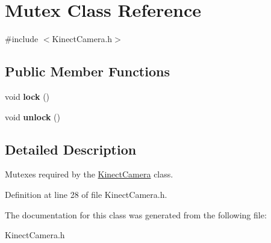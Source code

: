 \hypertarget{class_mutex}{
\section{Mutex Class Reference}
\label{class_mutex}
}


{\ttfamily \#include $<$KinectCamera.h$>$}

\subsection*{Public Member Functions}
\begin{DoxyCompactItemize}
\item 
\hypertarget{class_mutex_ad91be808bf0a60a16f10b897ec246d3a}{
void {\bfseries lock} ()}
\label{class_mutex_ad91be808bf0a60a16f10b897ec246d3a}

\item 
\hypertarget{class_mutex_a546a5b797ba29959357586aa2b3740a8}{
void {\bfseries unlock} ()}
\label{class_mutex_a546a5b797ba29959357586aa2b3740a8}

\end{DoxyCompactItemize}


\subsection{Detailed Description}
Mutexes required by the \hyperlink{class_kinect_camera}{KinectCamera} class. 

Definition at line 28 of file KinectCamera.h.



The documentation for this class was generated from the following file:\begin{DoxyCompactItemize}
\item 
KinectCamera.h\end{DoxyCompactItemize}
